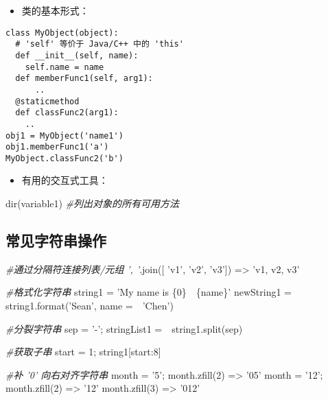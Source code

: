 \documentclass[utf-8]{ctexart}
\newenvironment{Shaded}{}{}
\newcommand{\DecValTok}[1]{\textcolor[rgb]{0.25,0.63,0.44}{#1}}
\newcommand{\SpecialCharTok}[1]{\textcolor[rgb]{0.25,0.44,0.63}{#1}}
\newcommand{\StringTok}[1]{\textcolor[rgb]{0.25,0.44,0.63}{#1}}
\newcommand{\CommentTok}[1]{\textcolor[rgb]{0.38,0.63,0.69}{\textit{#1}}}
\newcommand{\OperatorTok}[1]{\textcolor[rgb]{0.40,0.40,0.40}{#1}}
\newcommand{\BuiltInTok}[1]{#1}
\newcommand{\NormalTok}[1]{#1}
\begin{document}
\begin{itemize}
\item
  类的基本形式：
\end{itemize}

\begin{verbatim}
class MyObject(object):
  # 'self' 等价于 Java/C++ 中的 'this'
  def __init__(self, name):
    self.name = name
  def memberFunc1(self, arg1):
      ..
  @staticmethod
  def classFunc2(arg1):
    ..
obj1 = MyObject('name1')
obj1.memberFunc1('a')
MyObject.classFunc2('b')
\end{verbatim}

\begin{itemize}
\item
  有用的交互式工具：
\end{itemize}

\begin{Shaded}
\begin{Highlighting}[]
\BuiltInTok{dir}\NormalTok{(variable1) }\CommentTok{#列出对象的所有可用方法}
\end{Highlighting}
\end{Shaded}

\hypertarget{header-n354}{\subsection{常见字符串操作}\label{header-n354}}

\begin{Shaded}
\begin{Highlighting}[]
\CommentTok{#通过分隔符连接列表/元组}
\CommentTok{', '}\NormalTok{.join([ }\StringTok{'v1'}\NormalTok{, }\StringTok{'v2'}\NormalTok{, }\StringTok{'v3'}\NormalTok{]) }\OperatorTok{=>} \StringTok{'v1, v2, v3'}

\CommentTok{#格式化字符串}
\NormalTok{string1 }\OperatorTok{=} \StringTok{'My name is }\SpecialCharTok{\{0\}}\StringTok{　}\SpecialCharTok{\{name\}}\StringTok{'}
\NormalTok{newString1 }\OperatorTok{=}\NormalTok{ string1.}\BuiltInTok{format}\NormalTok{(}\StringTok{'Sean'}\NormalTok{, name }\OperatorTok{=}　\StringTok{'Chen'}\NormalTok{)}

\CommentTok{#分裂字符串}
\NormalTok{sep }\OperatorTok{=} \StringTok{'-'}\OperatorTok{;}
\NormalTok{stringList1 }\OperatorTok{=}\NormalTok{　string1.split(sep)}

\CommentTok{#获取子串}
\NormalTok{start }\OperatorTok{=} \DecValTok{1}\OperatorTok{;}
\NormalTok{string1[start:}\DecValTok{8}\NormalTok{]}

\CommentTok{#补 '0' 向右对齐字符串}
\NormalTok{month }\OperatorTok{=} \StringTok{'5'}\OperatorTok{;}
\NormalTok{month.zfill(}\DecValTok{2}\NormalTok{) }\OperatorTok{=>} \StringTok{'05'}
\NormalTok{month }\OperatorTok{=} \StringTok{'12'}\OperatorTok{;}
\NormalTok{month.zfill(}\DecValTok{2}\NormalTok{) }\OperatorTok{=>} \StringTok{'12'}
\NormalTok{month.zfill(}\DecValTok{3}\NormalTok{) }\OperatorTok{=>} \StringTok{'012'}
\end{Highlighting}
\end{Shaded}
\end{document}
